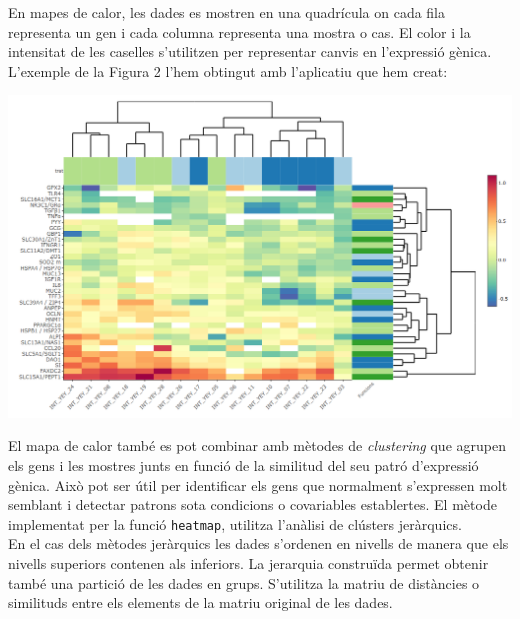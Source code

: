 \documentclass[english]{article}
\begin{document}
En mapes de calor, les dades es mostren en una quadrícula on cada fila representa un gen i cada columna representa una mostra o cas. El color i la intensitat de les caselles s'utilitzen per representar canvis en l'expressió gènica.
\\

L'exemple de la Figura 2 l'hem obtingut amb l'aplicatiu que hem creat:
\begin{center}
\includegraphics[scale=0.2]{heatmap.png}
\end{center}

El mapa de calor també es pot combinar amb mètodes de \textit{clustering} que agrupen els gens i les mostres junts en funció de la similitud del seu patró d'expressió gènica. Això pot ser útil per identificar els gens que normalment s'expressen molt semblant i detectar patrons sota condicions o covariables establertes. El mètode implementat per la funció \texttt{heatmap}, utilitza l'anàlisi de clústers jeràrquics.
\\

En el cas dels mètodes jeràrquics les dades s'ordenen en nivells de manera que els nivells superiors contenen als inferiors. La jerarquia construïda permet obtenir també una partició de les dades en grups. S'utilitza la matriu de distàncies o similituds entre els elements de la matriu original de les dades.
\\
\end{document}
